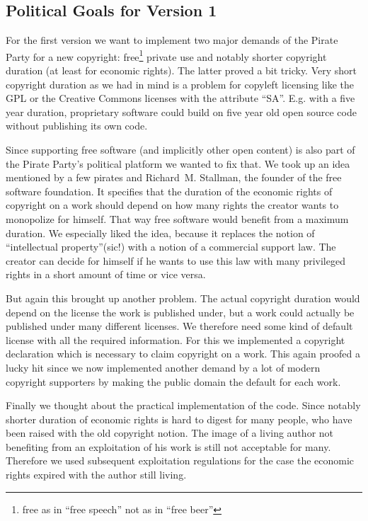 \subsection{Political Goals for Version 1}

For the first version we want to implement two major demands of the Pirate Party for a new copyright: free\footnote{free as in ``free speech'' not as in ``free beer''} private use and notably shorter copyright duration (at least for economic rights). The latter proved a bit tricky. Very short copyright duration as we had in mind is a problem for copyleft licensing like the GPL or the Creative Commons licenses with the attribute ``SA''. E.g. with a five year duration, proprietary software could build on five year old open source code without publishing its own code. 

Since supporting free software (and implicitly other open content) is also part of the Pirate Party's political platform we wanted to fix that. We took up an idea mentioned by a few pirates and Richard~M. Stallman, the founder of the free software foundation. It specifies that the duration of the economic rights of copyright on a work should depend on how many rights the creator wants to monopolize for himself. That way free software would benefit from a maximum duration. We especially liked the idea, because it replaces the notion of ``intellectual property''(sic!) with a notion of a commercial support law. The creator can decide for himself if he wants to use this law with many privileged rights in a short amount of time or vice versa. 

But again this brought up another problem. The actual copyright duration would depend on the license the work is published under, but a work could actually be published under many different licenses. We therefore need some kind of default license with all the required information. For this we implemented a copyright declaration which is necessary to claim copyright on a work. This again proofed a lucky hit since we now implemented another demand by a lot of modern copyright supporters by making the public domain the default for each work.

Finally we thought about the practical implementation of the code. Since notably shorter duration of economic rights is hard to digest for many people, who have been raised with the old copyright notion. The image of a living author not benefiting from an exploitation of his work is still not acceptable for many. Therefore we used subsequent exploitation regulations for the case the economic rights expired with the author still living.

